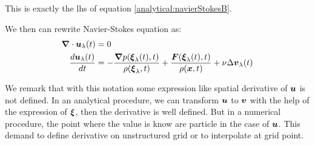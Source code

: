 This is exactly the lhs of equation \ref{analytical:navierStokesB}.

We then can rewrite Navier-Stokes equation as:
\begin{align}
\label{analytical:navierStokesLagA}
{\boldsymbol {\nabla}} \cdot {\boldsymbol {u}}_{\lambda}(t)&=0\\
\label{analytical:navierStokesLagB}
\frac{d {\boldsymbol {u}}_{\lambda}(t)}{d t}&=-\frac{{\boldsymbol {\nabla}} p({\boldsymbol {\xi}}_{\lambda}(t),t)}{\rho({\boldsymbol {\xi}}_{\lambda},t)}+\frac{{\boldsymbol {F}}({\boldsymbol {\xi}}_{\lambda}(t),t)}{\rho({\boldsymbol {x}},t)}+\nu \Delta {\boldsymbol {v}}_{\lambda}(t)
\end{align}

\begin{rem}
We remark that with this notation some expression like spatial derivative of ${\boldsymbol {u}}$ is not defined.
In an analytical procedure, we can transform ${\boldsymbol {u}}$ to ${\boldsymbol {v}}$ with the help of the expression of ${\boldsymbol {\xi}}$, then the derivative is well defined.
But in a numerical procedure, the point where the value is know are particle in the case of ${\boldsymbol {u}}$. This demand to define derivative on unstructured grid
or to interpolate at grid point.
\end{rem}

